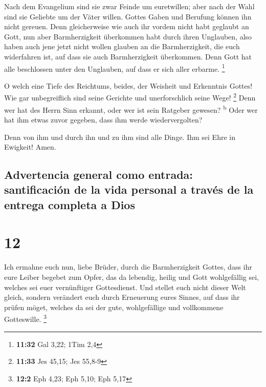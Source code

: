  Nach dem Evangelium sind sie zwar Feinde um euretwillen;
aber nach der Wahl sind sie Geliebte um der Väter willen.
 Gottes Gaben und Berufung können ihn nicht gereuen.
 Denn gleicherweise wie auch ihr vordem nicht habt
geglaubt an Gott, nun aber Barmherzigkeit überkommen habt durch ihren
Unglauben,  also haben auch jene jetzt nicht wollen
glauben an die Barmherzigkeit, die euch widerfahren ist, auf dass sie
auch Barmherzigkeit überkommen.  Denn Gott hat alle
beschlossen unter den Unglauben, auf dass er sich aller erbarme.
\footnote{\textbf{11:32} Gal 3,22; 1Tim 2,4}

 O welch eine Tiefe des Reichtums, beides, der Weisheit
und Erkenntnis Gottes! Wie gar unbegreiflich sind seine Gerichte und
unerforschlich seine Wege! \footnote{\textbf{11:33} Jes 45,15; Jes
  55,8-9}  Denn wer hat des Herrn Sinn erkannt, oder wer
ist sein Ratgeber gewesen? \textsuperscript{b}  Oder wer
hat ihm etwas zuvor gegeben, dass ihm werde wiedervergolten?

 Denn von ihm und durch ihn und zu ihm sind alle Dinge.
Ihm sei Ehre in Ewigkeit! Amen.

\hypertarget{advertencia-general-como-entrada-santificaciuxf3n-de-la-vida-personal-a-travuxe9s-de-la-entrega-completa-a-dios}{%
\subsection{Advertencia general como entrada: santificación de la vida
personal a través de la entrega completa a
Dios}\label{advertencia-general-como-entrada-santificaciuxf3n-de-la-vida-personal-a-travuxe9s-de-la-entrega-completa-a-dios}}

\hypertarget{section-11}{%
\section{12}\label{section-11}}

 Ich ermahne euch nun, liebe Brüder, durch die
Barmherzigkeit Gottes, dass ihr eure Leiber begebet zum Opfer, das da
lebendig, heilig und Gott wohlgefällig sei, welches sei euer
vernünftiger Gottesdienst.  Und stellet euch nicht dieser
Welt gleich, sondern verändert euch durch Erneuerung eures Sinnes, auf
dass ihr prüfen möget, welches da sei der gute, wohlgefällige und
vollkommene Gotteswille. \footnote{\textbf{12:2} Eph 4,23; Eph 5,10; Eph
  5,17}

